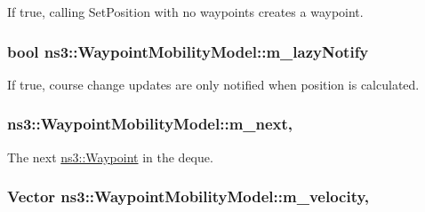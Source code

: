 If true, calling Set\+Position with no waypoints creates a waypoint. 

\subsubsection[{\texorpdfstring{m\+\_\+lazy\+Notify}{m_lazyNotify}}]{\setlength{\rightskip}{0pt plus 5cm}bool ns3\+::\+Waypoint\+Mobility\+Model\+::m\+\_\+lazy\+Notify\hspace{0.3cm}{\ttfamily [private]}}\hypertarget{classns3_1_1WaypointMobilityModel_a8da394b74b52cf59fbee7372167e6a45}{}\label{classns3_1_1WaypointMobilityModel_a8da394b74b52cf59fbee7372167e6a45}


If true, course change updates are only notified when position is calculated. 

\subsubsection[{\texorpdfstring{m\+\_\+next}{m_next}}]{ ns3\+::\+Waypoint\+Mobility\+Model\+::m\+\_\+next\hspace{0.3cm}{\ttfamily [mutable]}, {\ttfamily [private]}}\hypertarget{classns3_1_1WaypointMobilityModel_acac78d6b87956c61ad2c8959381f125c}{}\label{classns3_1_1WaypointMobilityModel_acac78d6b87956c61ad2c8959381f125c}


The next \hyperlink{classns3_1_1Waypoint}{ns3\+::\+Waypoint} in the deque. 

\subsubsection[{\texorpdfstring{m\+\_\+velocity}{m_velocity}}]{\setlength{\rightskip}{0pt plus 5cm}Vector ns3\+::\+Waypoint\+Mobility\+Model\+::m\+\_\+velocity\hspace{0.3cm}{\ttfamily [mutable]}, {\ttfamily [private]}}\hypertarget{classns3_1_1WaypointMobilityModel_a0f1a1f647002bf2dcfea5f7f5776d1b1}{}\label{classns3_1_1WaypointMobilityModel_a0f1a1f647002bf2dcfea5f7f5776d1b1}


